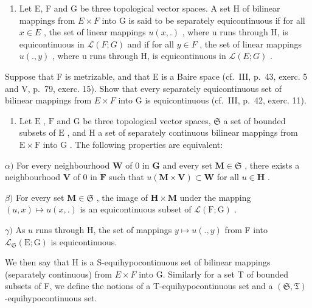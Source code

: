 \begin{enumerate}
\def\labelenumi{\arabic{enumi})}
\setcounter{enumi}{5}
\tightlist
\item
  Let E, F and G be three topological vector spaces. A set H of bilinear mappings from \(E \times F\) into G is said to be separately equicontinuous if for all \(x \in E\) , the set of linear mappings \(u(x, .)\) , where u runs through H, is equicontinuous in \(\mathcal{L}(F; G)\) and if for all \(y \in F\) , the set of linear mappings \(u(. , y)\) , where u runs through H, is equicontinuous in \(\mathcal{L}(E; G)\) .
\end{enumerate}

Suppose that F is metrizable, and that E is a Baire space (cf.~III, p.~43, exerc. 5 and V, p.~79, exerc. 15). Show that every separately equicontinuous set of bilinear mappings from \(E \times F\) into G is equicontinuous (cf.~III, p.~42, exerc. 11).

\begin{enumerate}
\def\labelenumi{\arabic{enumi})}
\setcounter{enumi}{6}
\tightlist
\item
  Let \(\mathrm{E}\) , \(\mathrm{F}\) and \(\mathrm{G}\) be three topological vector spaces, \(\mathfrak{S}\) a set of bounded subsets of \(\mathrm{E}\) , and \(\mathrm{H}\) a set of separately continuous bilinear mappings from \(\mathrm{E} \times \mathrm{F}\) into \(\mathrm{G}\) . The following properties are equivalent:
\end{enumerate}

\(\alpha)\) For every neighbourhood \(\mathbf{W}\) of 0 in \(\mathbf{G}\) and every set \(\mathbf{M} \in \mathfrak{S}\) , there exists a neighbourhood \(\mathbf{V}\) of 0 in \(\mathbf{F}\) such that \(u(\mathbf{M} \times \mathbf{V}) \subset \mathbf{W}\) for all \(u \in \mathbf{H}\) .

\(\beta)\) For every set \(\mathbf{M} \in \mathfrak{S}\) , the image of \(\mathbf{H} \times \mathbf{M}\) under the mapping \((u, x) \mapsto u(x, .)\) is an equicontinuous subset of \(\mathcal{L}(\mathrm{F}; \mathrm{G})\) .

\(\gamma)\) As \(u\) runs through H, the set of mappings \(y \mapsto u(., y)\) from F into \(\mathcal{L}_{\mathfrak{S}}(\mathrm{E}; \mathrm{G})\) is equicontinuous.

We then say that H is a S-equihypocontinuous set of bilinear mappings (separately continuous) from \(E \times F\) into G. Similarly for a set T of bounded subsets of F, we define the notions of a T-equihypocontinuous set and a \((\mathfrak{S}, \mathfrak{T})\) -equihypocontinuous set.

